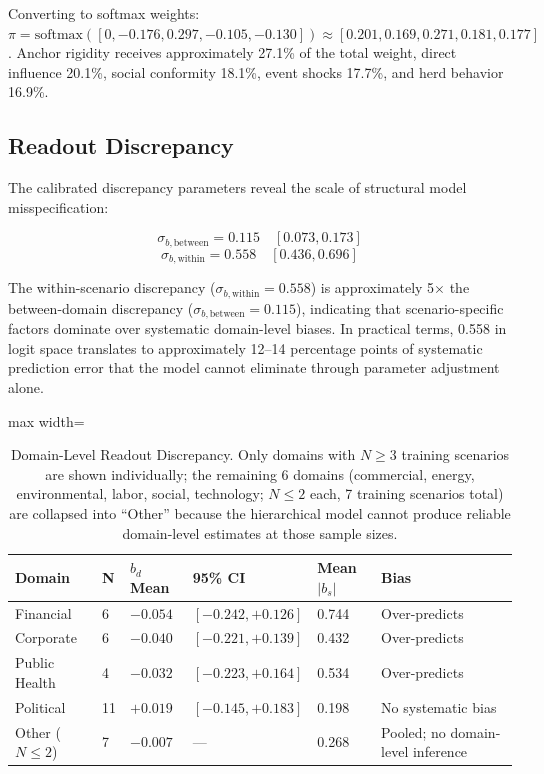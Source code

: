 \documentclass[12pt]{article}
\begin{document}
Converting to softmax weights: $\pi = \text{softmax}([0, -0.176, 0.297, -0.105, -0.130]) \approx [0.201, 0.169, 0.271, 0.181, 0.177]$. Anchor rigidity receives approximately 27.1\% of the total weight, direct influence 20.1\%, social conformity 18.1\%, event shocks 17.7\%, and herd behavior 16.9\%.

\subsection{Readout Discrepancy}

The calibrated discrepancy parameters reveal the scale of structural model misspecification:

\begin{equation}\label{eq:23}
\sigma_{b,\text{between}} = 0.115 \quad [0.073, 0.173]
\end{equation}
\begin{equation}\label{eq:24}
\sigma_{b,\text{within}} = 0.558 \quad [0.436, 0.696]
\end{equation}

The within-scenario discrepancy ($\sigma_{b,\text{within}} = 0.558$) is approximately 5$\times$ the between-domain discrepancy ($\sigma_{b,\text{between}} = 0.115$), indicating that scenario-specific factors dominate over systematic domain-level biases. In practical terms, 0.558 in logit space translates to approximately 12--14 percentage points of systematic prediction error that the model cannot eliminate through parameter adjustment alone.

\begin{table}[H]
\centering
\caption{Domain-Level Readout Discrepancy. Only domains with $N \geq 3$ training scenarios are shown individually; the remaining 6 domains (commercial, energy, environmental, labor, social, technology; $N \leq 2$ each, 7 training scenarios total) are collapsed into ``Other'' because the hierarchical model cannot produce reliable domain-level estimates at those sample sizes.}
\label{tab:domain_discrepancy}
\begin{adjustbox}{max width=\textwidth}
\begin{tabular}{@{}llllll@{}}
\toprule
Domain & N & $b_d$ Mean & 95\% CI & Mean $|b_s|$ & Bias \\
\midrule
Financial     & 6  & $-0.054$ & $[-0.242, +0.126]$ & 0.744 & Over-predicts \\
Corporate     & 6  & $-0.040$ & $[-0.221, +0.139]$ & 0.432 & Over-predicts \\
Public Health & 4  & $-0.032$ & $[-0.223, +0.164]$ & 0.534 & Over-predicts \\
Political     & 11 & $+0.019$ & $[-0.145, +0.183]$ & 0.198 & No systematic bias \\
\midrule
Other ($N \leq 2$) & 7 & $-0.007$ & --- & 0.268 & Pooled; no domain-level inference \\
\bottomrule
\end{tabular}
\end{adjustbox}
\end{table}
\end{document}
